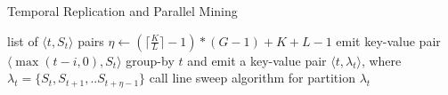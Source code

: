 \begin{algorithm}[h]
\small
\caption{Temporal Replication and Parallel Mining}
\label{algo:trm_overview}
\begin{algorithmic}[1]
\Require list of $\langle t, S_t \rangle$ pairs
\State $\eta \gets (\lceil \frac{K}{L} \rceil -1)*(G-1)+K+L-1$
\label{code:trm-map-start}
		\State emit key-value pair $\langle \max(t-i,0), S_t \rangle$ 
	\EndFor  
\EndFor
\label{code:trm-map-end}
\label{code:trm-par-start}
\State group-by $t$ and emit a key-value pair $\langle t, \lambda_t\rangle$, where $\lambda_t = \{S_t, S_{t+1}, .. S_{t+\eta-1}\} $
\EndFor
\label{code:trm-par-end}
\label{code:trm-red-start}
\State call line sweep algorithm for partition $\lambda_t$
\label{code:trm-red-end}
\EndFor
\end{algorithmic}
\end{algorithm}


